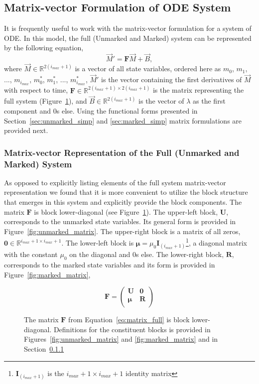 \documentclass[review]{elsarticle}
\let\bs\boldsymbol
\begin{document}
\subsection{Matrix-vector Formulation of ODE System}
It is frequently useful to work with the matrix-vector formulation for a system of ODE.  In this model, the full (Unmarked and Marked) system can be represented by the following equation, \begin{equation}\label{eq:matrix_full}\vec{M}'=\boldsymbol{F}\vec{M}+\vec{B},\end{equation} where $\vec{M}\in\mathbb{R}^{2(i_{max}+1)}$ is a vector of all state variables, ordered here as $m_0$, $m_1$, ..., $m_{i_{max}}$, $m^*_0$, $m^*_1$, ..., $m^*_{i_{max}}$, $\vec{M}'$ is the vector containing the first derivatives of $\vec{M}$ with respect to time, $\bs{F}\in\mathbb{R}^{2(i_{max}+1)\times 2(i_{max}+1)}$ is the matrix representing the full system (Figure~\ref{fig:full_matrix}), and $\vec{B}\in\mathbb{R}^{2(i_{max}+1)}$ is the vector of $\lambda$ as the first component and 0s else. Using the functional forms presented in Section~\ref{sec:unmarked_simp} and \ref{sec:marked_simp} matrix formulations are provided next.

\subsubsection{Matrix-vector Representation of the Full (Unmarked and Marked) System}\label{sec:full_matrix}
As opposed to explicitly listing elements of the full system matrix-vector representation we found that it is more convenient to utilize the block structure that emerges in this system and explicitly provide the block components.  The matrix $\bs{F}$ is block lower-diagonal (see Figure~\ref{fig:full_matrix}).  The upper-left block, $\bs{U}$, corresponds to the unmarked state variables.  Its general form is provided in Figure~\ref{fig:unmarked_matrix}. The upper-right block is a matrix of all zeros, $\bs{0}\in\mathbb{R}^{i_{max}+1\times i_{max}+1}$.  The lower-left block is $\bs{\mu}=\mu_0\bs{I}_{(i_{max}+1)}$\footnote{$\bs{I}_{(i_{max}+1)}$ is the $i_{max}+1\times i_{max}+1$ identity matrix}, a diagonal matrix with the constant $\mu_0$ on the diagonal and 0s else.  The lower-right block, $\bs{R}$, corresponds to the marked state variables and its form is provided in Figure~\ref{fig:marked_matrix},

\begin{figure}[ht]
\caption{The matrix $\bs{F}$ from Equation~\ref{eq:matrix_full} is block lower-diagonal.  Definitions for the constituent blocks is provided in Figures~\ref{fig:unmarked_matrix} and \ref{fig:marked_matrix} and in Section~\ref{sec:full_matrix}}
\label{fig:full_matrix}
\[
\bs{F}=\left(\begin{array}{cc}
\bs{U} & \bs{0} \\
\bs{\mu} & \bs{R} \\
\end{array} \right)
\]
\end{figure}
\end{document}
